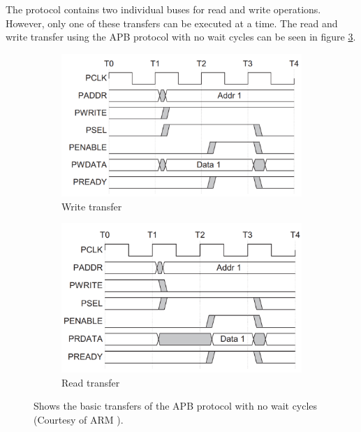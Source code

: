 The protocol contains two individual buses for read and write operations. However, only one of these transfers can be executed at a time. The read and write transfer using the APB protocol with no wait cycles can be seen in figure \ref{apb_transfers_no_wait}.

\begin{figure}[H]
     \centering
     \begin{subfigure}[b]{0.49\textwidth}
         \centering
         \includegraphics[width=\textwidth]{subfiles/imgs/IP_Blocks_Pics/apb_write_no_wait.pdf}
         \caption{Write transfer}
         \label{fig:apb_write_no_wait}
     \end{subfigure}
     \hfill
     \begin{subfigure}[b]{0.49\textwidth}
         \centering
         \includegraphics[width=\textwidth]{subfiles/imgs/IP_Blocks_Pics/apb_read_no_wait.pdf}
         \caption{Read transfer}
         \label{fig:apb_read_no_wait}
     \end{subfigure}
     \hfill
     \caption{Shows the basic transfers of the APB protocol with no wait cycles (Courtesy of ARM \cite{apbReference}).}
     \label{apb_transfers_no_wait}
\end{figure}

